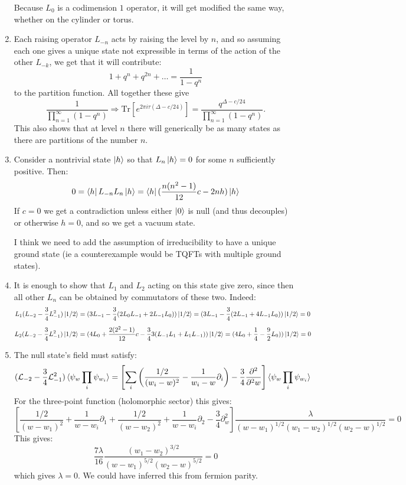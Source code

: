 \documentclass[11pt]{article}
\begin{document}
\begin{enumerate}
	Because $L_0$ is a codimension $1$ operator, it will get modified the same way, whether on the cylinder or torus. 

	\item Each raising operator $L_{-n}$ acts by raising the level by $n$, and so assuming each one gives a unique state not expressible in terms of the action of the other $L_{-k}$, we get that it will contribute:
	\[
		1 + q^n + q^{2n} + \dots = \frac{1}{1-q^n}
	\]
	to the partition function. All together these give
	\[
		\frac{1}{\prod_{n=1}^\infty (1-q^n)} \Rightarrow \mathrm{Tr}[e^{2 \pi i \tau (\Delta - c/24)}] = \frac{q^{\Delta - c/24}}{\prod_{n=1}^\infty (1-q^n)}.
	\]
	This also shows that at level $n$ there will generically be as many states as there are partitions of the number $n$.
	
	\item Consider a nontrivial state $\ket{h}$ so that $L_{n} \ket{h} = 0$ for some $n$ sufficiently positive. Then: 
	\[
		0 = \bra{h} L_{-n} L_{n} \ket{h} = \bra{h} (\frac{n(n^2-1)}{12} c - 2nh) \ket{h}
	\]
	If $c = 0$ we get a contradiction unless either $\ket{0}$ is null (and thus decouples) or otherwise $h = 0$, and so we get a vacuum state.
	
	I think we need to add the assumption of irreducibility to have a unique ground state (ie a counterexample would be TQFTs with multiple ground states). 
	
	\item It is enough to show that $L_1$ and $L_2$ acting on this state give zero, since then all other $L_n$ can be obtained by commutators of these two. Indeed:
	\[
		L_1 (L_{-2} - \frac34 L_{-1}^2) \ket{1/2} = (3 L_{-1} -\frac34 (2 L_0 L_{-1} + 2 L_{-1} L_0 ) ) \ket{1/2} = (3 L_{-1} - \frac34 ( 2 L_{-1} + 4 L_{-1} L_0) ) \ket{1/2}  = 0
	\]
	\[
		L_2 (L_{-2} - \frac34 L_{-1}^2) \ket{1/2} = (4 L_0 + \frac{2 (2^2 - 1)}{12} c - \frac34 3 (L_{-1} L_1 + L_1 L_{-1})) \ket{1/2} = (4 L_0 + \frac14 - \frac92 L_0 )) \ket{1/2} = 0
	\]
	\item The null state's field must satisfy:
	\begin{equation}\label{eq:BPZ}
				(\mathcal L_{-2} - \frac34 \mathcal L_{-1}^2) \braket{\psi_{w} \prod_{i} \psi_{w_i}} = \left[\sum_{i} \left(\frac{1/2}{(w_i - w)^2} - \frac{1}{w_i - w} \partial_i\right) - \frac34 \frac{\partial^2}{\partial^2 w}\right] \braket{\psi_{w} \prod_{i} \psi_{w_i}}
	\end{equation}
	For the three-point function (holomorphic sector) this gives:
	\[
		\left[ \frac{1/2}{(w-w_1)^2} + \frac{1}{w-w_i} \partial_1 + \frac{1/2}{(w-w_2)^2} + \frac{1}{w-w_i} \partial_2 - \frac34 \partial^2_w \right] \frac{\lambda}{(w - w_1)^{1/2} (w_1 - w_2)^{1/2} (w_2 - w)^{1/2}} = 0
	\]
	This gives:
	\[
		\frac{7 \lambda}{16} \frac{(w_1 - w_2)^{3/2}}{(w-w_1)^{5/2} (w_2 - w)^{5/2}} = 0
	\]
	which gives $\lambda = 0$. We could have inferred this from fermion parity. 
	

\end{enumerate}
\end{document}

